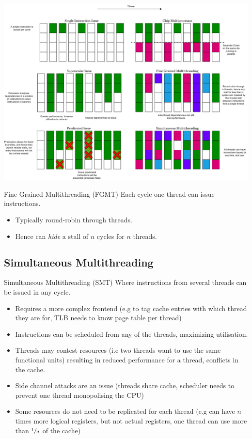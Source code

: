 
\begin{center}
    \includegraphics[width=\textwidth]{exploiting_parallelism/images/issues.drawio.png}
\end{center}
\begin{definitionbox}{Fine Grained Multithreading (FGMT)}
    Each cycle one thread can issue instructions.
    \begin{itemize}
        \item Typically round-robin through threads.
        \item Hence can \textit{hide} a stall of $n$ cycles for $n$ threads.
    \end{itemize}
\end{definitionbox}

\subsection{Simultaneous Multithreading}
\begin{definitionbox}{Simultaneous Multithreading (SMT)}
    Where instructions from several threads can be issued in any cycle.
    \begin{itemize}
        \item Requires a more complex frontend (e.g to tag cache entries with which thread they are for, TLB needs to know page table per thread)
        \item Instructions can be scheduled from any of the threads, maximizing utilisation.
        \item Threads may contest resources (i.e two threads want to use the same functional units) resulting in reduced performance for a thread, conflicts in the cache.
        \item Side channel attacks are an issue (threads share cache, scheduler needs to prevent one thread monopolising the CPU)
        \item Some resources do not need to be replicated for each thread (e.g can have $n$ times more logical registers, but not actual registers, one thread can use more than $\sfrac{1}{n}$ of the cache)
    \end{itemize}
\end{definitionbox}

